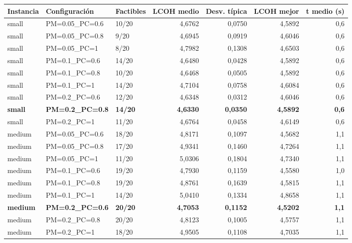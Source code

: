 \begin{table}[H]
    \centering
    \small
    \renewcommand{\arraystretch}{1.25}
    \begin{tabular}{lllrrrr}
        \hline
        \textbf{Instancia} & \textbf{Configuración} & \textbf{Factibles} & \textbf{LCOH medio} & \textbf{Desv. típica} & \textbf{LCOH mejor} & \textbf{t medio (s)} \\
        \hline
        small & PM=0.05\_PC=0.6 & 10/20 & 4,6762 & 0,0750 & 4,5892 & 0,6 \\
        small & PM=0.05\_PC=0.8 & 9/20 & 4,6945 & 0,0919 & 4,6046 & 0,6 \\
        small & PM=0.05\_PC=1 & 8/20 & 4,7982 & 0,1308 & 4,6503 & 0,6 \\
        small & PM=0.1\_PC=0.6 & 14/20 & 4,6480 & 0,0428 & 4,5892 & 0,6 \\
        small & PM=0.1\_PC=0.8 & 10/20 & 4,6468 & 0,0505 & 4,5892 & 0,6 \\
        small & PM=0.1\_PC=1 & 14/20 & 4,7104 & 0,0758 & 4,6084 & 0,6 \\
        small & PM=0.2\_PC=0.6 & 12/20 & 4,6348 & 0,0312 & 4,6046 & 0,6 \\
        \textbf{small} & \textbf{PM=0.2\_PC=0.8} & \textbf{14/20} & \textbf{4,6330} & \textbf{0,0350} & \textbf{4,5892} & \textbf{0,6} \\
        small & PM=0.2\_PC=1 & 11/20 & 4,6764 & 0,0458 & 4,6149 & 0,6 \\
        \hline
        medium & PM=0.05\_PC=0.6 & 18/20 & 4,8171 & 0,1097 & 4,5682 & 1,1 \\
        medium & PM=0.05\_PC=0.8 & 17/20 & 4,9341 & 0,1460 & 4,7264 & 1,1 \\
        medium & PM=0.05\_PC=1 & 11/20 & 5,0306 & 0,1804 & 4,7340 & 1,1 \\
        medium & PM=0.1\_PC=0.6 & 19/20 & 4,7930 & 0,1159 & 4,5580 & 1,0 \\
        medium & PM=0.1\_PC=0.8 & 19/20 & 4,8761 & 0,1639 & 4,5815 & 1,1 \\
        medium & PM=0.1\_PC=1 & 14/20 & 5,0410 & 0,1334 & 4,8658 & 1,1 \\
        \textbf{medium} & \textbf{PM=0.2\_PC=0.6} & \textbf{20/20} & \textbf{4,7053} & \textbf{0,1152} & \textbf{4,5202} & \textbf{1,1} \\
        medium & PM=0.2\_PC=0.8 & 20/20 & 4,8123 & 0,1005 & 4,5757 & 1,1 \\
        medium & PM=0.2\_PC=1 & 18/20 & 4,9505 & 0,1108 & 4,7035 & 1,1 \\

\end{tabular}
\end{table}
